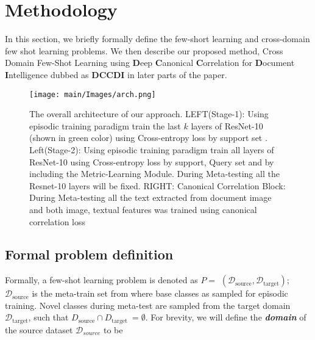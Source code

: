 
\section{Methodology}

In this section, we briefly formally define the few-short learning and cross-domain few shot learning problems. We then describe our proposed method, Cross Domain Few-Shot Learning using  \textbf{D}eep \textbf{C}anonical  \textbf{C}orrelation for  \textbf{D}ocument  \textbf{I}ntelligence dubbed as  \textbf{DCCDI} in later parts of the paper.  \\
\begin{figure*}[t]
  \begin{center}
    \texttt{[image: main/Images/arch.png]}
  \end{center}
  \caption{The overall architecture of our approach. LEFT(Stage-1): Using episodic training paradigm train the last $k$ layers of ResNet-10 (shown in green color) using Cross-entropy loss by support set . Left(Stage-2): Using episodic training paradigm train all layers of ResNet-10 using Cross-entropy loss by support, Query set and by including the Metric-Learning Module. During Meta-testing all the Resnet-10 layers will be fixed. RIGHT: Canonical Correlation Block: During Meta-testing all the text extracted from document image and both image, textual features was trained using canonical correlation loss }
  \label{fig:overview}
\end{figure*}
\subsection{Formal problem definition}
Formally, a few-shot learning problem is denoted as $P=$ $( \mathcal{D}_{\text {source}}, \mathcal{D}_{\text {target}})$; $\mathcal{D}_{\text {source}}$ is  the meta-train set from where base classes as sampled for episodic training. Novel classes during meta-test are sampled from the target domain $\mathcal{D}_{\text {target}}$, such that $D_{\text {source}} \cap D_{\text {target }}=\emptyset$. For brevity, we will define the \textit{\textbf{domain}} of the source dataset $\mathcal{D}_{source}$ to be 

